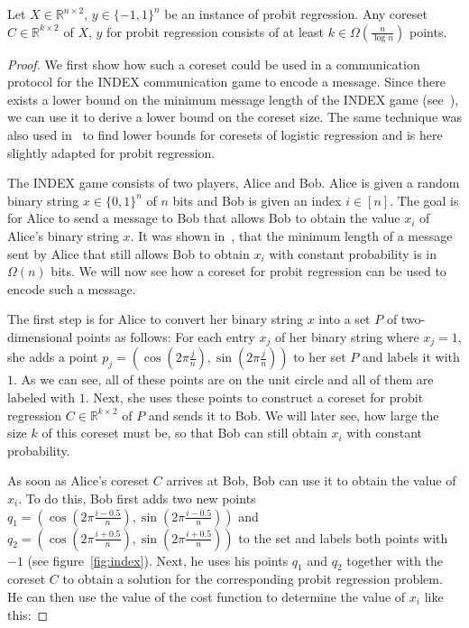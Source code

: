 \begin{theorem}
    Let $X \in \mathbb{R}^{n \times 2}$, $y \in \{-1, 1\}^n$ be
    an instance of probit regression.
    Any coreset $C \in \mathbb{R}^{k \times 2}$ of $X$, $y$
    for probit regression consists of
    at least $k \in \Omega\left(\frac{n}{\log{n}}\right)$ points.
\end{theorem}
\begin{proof}
    We first show how such a coreset could be used in a
    communication protocol for the INDEX communication game
    to encode a message.
    Since there exists a lower bound on the minimum
    message length of the INDEX game (see~\cite{index}),
    we can use it to derive a lower bound on the
    coreset size.
    The same technique was also used in~\cite{on-coresets} to find
    lower bounds for coresets of logistic regression and is here slightly
    adapted for probit regression.

    The INDEX game consists of two players, Alice and Bob.
    Alice is given a random binary string $x \in \{0, 1\}^n$ of $n$ bits
    and Bob is given an index $i \in [n]$.
    The goal is for Alice to send a message to Bob that allows
    Bob to obtain the value $x_i$ of Alice's binary string $x$.
    It was shown in~\cite{index}, that the minimum length of a message
    sent by Alice that still allows Bob to obtain $x_i$ with
    constant probability is in $\Omega(n)$ bits.
    We will now see how a coreset for probit regression can be used
    to encode such a message.

    The first step is for Alice to convert her binary string $x$ into
    a set $P$ of two-dimensional points as follows:
    For each entry $x_j$ of her binary string where $x_j = 1$, she adds
    a point $p_j = \left( \cos{\left(2 \pi \frac{j}{n}\right)},
        \sin{\left(2 \pi \frac{j}{n}\right)} \right)$
    to her set $P$ and labels it with $1$.
    As we can see, all of these points are on the unit circle and all
    of them are labeled with $1$.
    Next, she uses these points to construct a coreset for probit regression
    $C \in \mathbb{R}^{k \times 2}$ of $P$
    and sends it to Bob. We will later see, how
    large the size $k$ of this coreset must be, so that Bob can still
    obtain $x_i$ with constant probability.

    As soon as Alice's coreset $C$ arrives at Bob, Bob can use it to
    obtain the value of $x_i$.
    To do this, Bob first adds two new points
    $q_1 = \left( \cos{\left(2 \pi \frac{i - 0.5}{n}\right)},
        \sin{\left(2 \pi \frac{i - 0.5}{n}\right)} \right)$
    and
    $q_2 = \left( \cos{\left(2 \pi \frac{i + 0.5}{n}\right)},
        \sin{\left(2 \pi \frac{i + 0.5}{n}\right)} \right)$
    to the set and labels both points with $-1$ (see figure~\ref{fig:index}).
    Next, he uses his points $q_1$ and $q_2$ together with the coreset $C$ to
    obtain a solution for the corresponding probit regression problem.
    He can then use the value of the cost function to determine the value
    of $x_i$ like this:


\end{proof}
